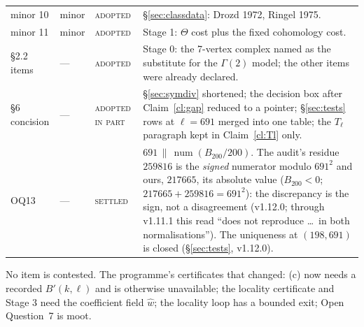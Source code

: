 \documentclass[11pt]{article}
\theoremstyle{remark}
\newcommand{\Ga}{\Gamma}
\DeclareMathOperator{\num}{num}
\begin{document}
\begin{center}
\begin{longtable}{@{}>{\raggedright\arraybackslash}p{1.6cm}>{\raggedright\arraybackslash}p{1.4cm}>{\raggedright\arraybackslash}p{2.3cm}>{\raggedright\arraybackslash}p{10.2cm}@{}}
minor 10 & minor & \textsc{adopted} & \S\ref{sec:classdata}: Drozd 1972, Ringel 1975. \\
minor 11 & minor & \textsc{adopted} & Stage 1: $\Theta$ cost plus the fixed cohomology cost. \\
\S2.2 items & --- & \textsc{adopted} & Stage 0: the 7-vertex complex named as the substitute for the $\Ga(2)$ model; the other items were already declared. \\
\S6 concision & --- & \textsc{adopted in part} & \S\ref{sec:symdiv} shortened; the decision box after Claim~\ref{cl:gap} reduced to a pointer; \S\ref{sec:tests} rows at $\ell=691$ merged into one table; the $T_\ell$ paragraph kept in Claim~\ref{cl:Tl} only. \\
OQ13 & --- & \textsc{settled} & $691\,\|\,\num(B_{200}/200)$. The audit's residue $259816$ is the \emph{signed} numerator modulo $691^2$ and ours, $217665$, its absolute value ($B_{200}<0$; $217665+259816=691^2$): the discrepancy is the sign, not a disagreement (v1.12.0; through v1.11.1 this read ``does not reproduce \ldots\ in both normalisations''). The uniqueness at $(198,691)$ is closed (\S\ref{sec:tests}, v1.12.0). \\
\bottomrule
\end{longtable}
\end{center}
No item is contested. The programme's certificates that changed: (c) now needs a recorded
$B'(k,\ell)$ and is otherwise unavailable; the locality certificate and Stage 3 need the
coefficient field $\hat w$; the locality loop has a bounded exit; Open Question~7 is moot.

\end{document}
